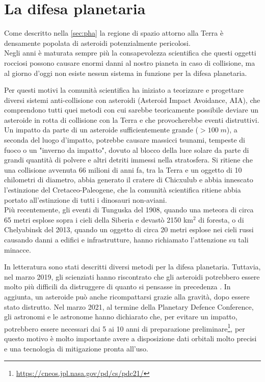 \documentclass[a4paper,11pt,openright]{book}
\begin{document}
\section{La difesa planetaria}
Come descritto nella \cref{sec:pha} la regione di spazio attorno alla Terra è densamente popolata di asteroidi potenzialmente pericolosi.\\
Negli anni è maturata sempre più la consapevolezza scientifica che questi oggetti rocciosi possono causare enormi danni al nostro pianeta in caso di collisione, ma al giorno d'oggi non esiste nessun sistema in funzione per la difesa planetaria.

Per questi motivi la comunità scientifica ha iniziato a teorizzare e progettare diversi sistemi anti-collisione con asteroidi (Asteroid Impact Avoidance, AIA), che comprendono tutti quei metodi con cui sarebbe teoricamente possibile deviare un asteroide in rotta di collisione con la Terra e che provocherebbe eventi distruttivi.\\
Un impatto da parte di un asteroide sufficientemente grande ($> 100\; m$), a seconda del luogo d'impatto, potrebbe causare massicci tsunami, tempeste di fuoco o un "inverno da impatto", dovuto al blocco della luce solare da parte di grandi quantità di polvere e altri detriti immessi nella stratosfera. Si ritiene che una collisione avvenuta 66 milioni di anni fa, tra la Terra e un oggetto di 10 chilometri di diametro, abbia generato il cratere di Chicxulub e abbia innescato l'estinzione del Cretaceo-Paleogene, che la comunità scientifica ritiene abbia portato all'estinzione di tutti i dinosauri non-aviani.\\
Più recentemente, gli eventi di Tunguska del 1908, quando una meteora di circa 65 metri esplose sopra i cieli della Siberia e devastò 2150 km$^2$ di foresta, o di Chelyabinsk del 2013, quando un oggetto di circa 20 metri esplose nei cieli russi causando danni a edifici e infrastrutture, hanno richiamato l'attenzione su tali minacce.

In letteratura sono stati descritti diversi metodi per la difesa planetaria. Tuttavia, nel marzo 2019, gli scienziati hanno riscontrato che gli asteroidi potrebbero essere molto più difficili da distruggere di quanto si pensasse in precedenza \citep{el_mir_new_2019}. In aggiunta, un asteroide può anche ricompattarsi grazie alla gravità, dopo essere stato distrutto. Nel marzo 2021, al termine della Planetary Defence Conference, gli astronomi e le astronome hanno dichiarato che, per evitare un impatto, potrebbero essere necessari dai 5 ai 10 anni di preparazione preliminare\footnote{\href{https://cneos.jpl.nasa.gov/pd/cs/pdc21/}{https://cneos.jpl.nasa.gov/pd/cs/pdc21/}}, per questo motivo è molto importante avere a disposizione dati orbitali molto precisi e una tecnologia di mitigazione pronta all'uso.
\end{document}
